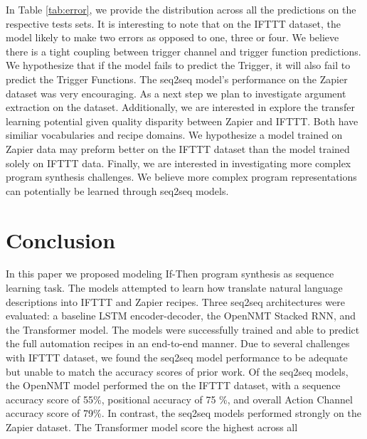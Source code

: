 \documentclass[letterpaper]{article} %
\begin{document}
In Table \ref{tab:error}, we provide the distribution across all the predictions on the respective tests sets. It is interesting to note that on the IFTTT dataset, the model likely to make two errors as opposed to one, three or four. We believe there is a tight coupling between trigger channel and trigger function predictions. We hypothesize that if the model fails to predict the Trigger, it will also fail to predict the Trigger Functions.  The seq2seq model's performance on the Zapier dataset was very encouraging. As a next step we plan to investigate argument extraction on the dataset. Additionally, we are interested in explore the transfer learning potential given quality disparity between Zapier and IFTTT. Both have similiar vocabularies and recipe domains. We hypothesize a model trained on Zapier data may preform better on the IFTTT dataset than the model trained solely on IFTTT data. Finally, we are interested in investigating more complex program synthesis challenges. We believe more complex program representations can potentially be learned through seq2seq models.


\section{Conclusion}
In this paper we proposed modeling If-Then program synthesis as sequence learning task. The models attempted to learn how translate natural language descriptions into IFTTT and Zapier recipes. Three seq2seq architectures were evaluated: a baseline LSTM encoder-decoder, the OpenNMT Stacked RNN, and the Transformer model. The models were successfully trained and able to predict the full automation recipes in an end-to-end manner. Due to several challenges with IFTTT dataset, we found the seq2seq model performance to be adequate but unable to match the accuracy scores of prior work. Of the seq2seq models, the OpenNMT model performed the on the IFTTT dataset, with a sequence accuracy score of 55\%, positional accuracy of 75 \%, and overall Action Channel accuracy score of 79\%. In contrast, the seq2seq models performed strongly on the Zapier dataset. The Transformer model score the highest across all


\clearpage

\end{document}

